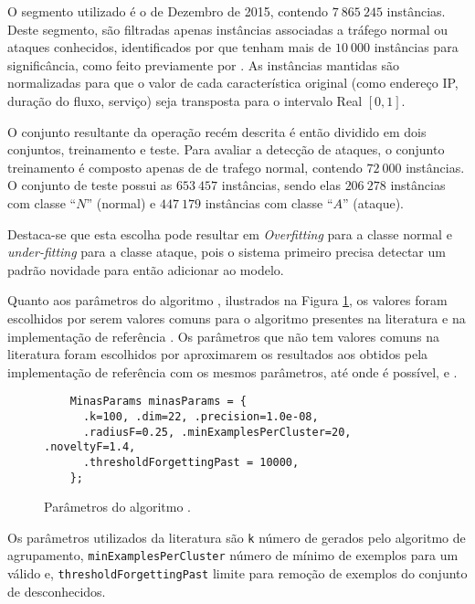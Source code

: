 O segmento utilizado é o de Dezembro de 2015, contendo $7\:865\:245$ instâncias.
Deste segmento, são filtradas apenas instâncias associadas a tráfego normal ou
ataques conhecidos, identificados por \nids que tenham mais de $10\:000$ instâncias
para significância, como feito previamente por .
As instâncias mantidas são normalizadas para que o valor de cada característica
original (como endereço IP, duração do fluxo, serviço) seja transposta para o
intervalo Real $[0, 1]$.

O conjunto resultante da operação recém descrita é então dividido em dois
conjuntos, treinamento e teste.
Para avaliar a detecção de ataques, o conjunto treinamento é composto apenas de
de trafego normal, contendo $72\:000$ instâncias.
O conjunto de teste possui as $653\:457$ instâncias, sendo elas
$206\:278$ instâncias com classe ``$N$'' (normal) e
$447\:179$ instâncias com classe ``$A$'' (ataque).

Destaca-se que esta escolha pode resultar em \emph{Overfitting} para a classe
normal e \emph{under-fitting} para a classe ataque, pois o sistema primeiro
precisa detectar um padrão novidade para então adicionar ao modelo.

Quanto aos parâmetros do algoritmo \minas, ilustrados na Figura
\ref{fig:params}, os valores foram escolhidos por serem valores comuns para o
algoritmo presentes na literatura \cite{Faria2013Minas,Faria2016minas} e na
implementação de referência  \cite{Faria2013source}.
Os parâmetros que não tem valores comuns na literatura foram escolhidos por
aproximarem os resultados aos obtidos pela implementação de referência 
com os mesmos parâmetros, até onde é possível, e \dataset.

\begin{figure}[htb]
  \centering
  \begin{lstlisting}
    MinasParams minasParams = {
      .k=100, .dim=22, .precision=1.0e-08,
      .radiusF=0.25, .minExamplesPerCluster=20, .noveltyF=1.4,
      .thresholdForgettingPast = 10000,
    };
  \end{lstlisting}
  \caption{Parâmetros do algoritmo \minas.}
  \label{fig:params}
\end{figure}

Os parâmetros utilizados da literatura são
\texttt{k} número de \mclusters gerados pelo algoritmo de agrupamento,
\texttt{minExamplesPerCluster} número de mínimo de exemplos para um \mcluster válido
e,
\texttt{thresholdForgettingPast} limite para remoção de exemplos do conjunto de
desconhecidos.

